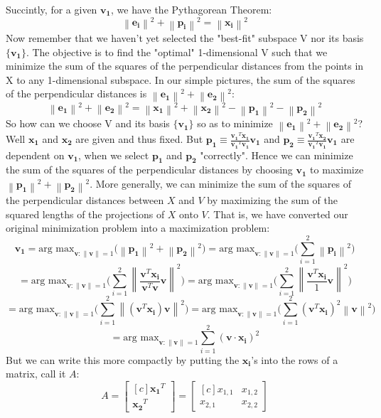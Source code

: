 \documentclass{tufte-handout}
\newcommand{\norm}[1]{\left\lVert#1\right\rVert}
\begin{document}
Succintly, for a given $\mathbf{v_1}$, we have the Pythagorean Theorem:
\[
\norm{\mathbf{e_i}}^2+\norm{\mathbf{p_i}}^2
=\norm{\mathbf{x_i}}^2
\]
Now remember that we haven't yet selected the "best-fit" subspace V nor its basis $\{\mathbf{v_1}\}$. The objective is to find the "optimal" 1-dimensional V such that we minimize the sum of the squares of the perpendicular distances from the points in X to any 1-dimensional subspace. In our simple pictures, the sum of the squares of the perpendicular distances is $\norm{\mathbf{e_1}}^2+\norm{\mathbf{e_2}}^2$:
\[
\norm{\mathbf{e_1}}^2+\norm{\mathbf{e_2}}^2
=
\norm{\mathbf{x_1}}^2+\norm{\mathbf{x_2}}^2
-
\norm{\mathbf{p_1}}^2-\norm{\mathbf{p_2}}^2
\]
So how can we choose V and its basis $\{\mathbf{v_1}\}$ so as to minimize $\norm{\mathbf{e_1}}^2+\norm{\mathbf{e_2}}^2$? Well $\mathbf{x_1}$ and $\mathbf{x_2}$ are given and thus fixed. But $\mathbf{p_1} \equiv\frac{\mathbf{v_1}^T\mathbf{x_1}} {\mathbf{v_1}^T\mathbf{v_1}}\mathbf{v_1}$ and $\mathbf{p_2} \equiv\frac{\mathbf{v_1}^T\mathbf{x_2}} {\mathbf{v_1}^T\mathbf{v_1}}\mathbf{v_1}$ are dependent on $\mathbf{v_1}$, when we select $\mathbf{p_1}$ and $\mathbf{p_2}$ "correctly". Hence we can minimize the sum of the squares of the perpendicular distances by choosing $\mathbf{v_1}$ to maximize $\norm{\mathbf{p_1}}^2+\norm{\mathbf{p_2}}^2$. More generally, we can minimize the sum of the squares of the perpendicular distances between $X$ and $V$ by maximizing the sum of the squared lengths of the projections of $X$ onto $V$. That is, we have converted our original minimization problem into a maximization problem:
\[
\mathbf{v_1}
=
\text{arg max}_
{\mathbf{v}:\norm{\mathbf{v}}=1}\Big(\norm{\mathbf{p_1}}^2+\norm{\mathbf{p_2}}^2\Big)
=
\text{arg max}_
{\mathbf{v}:\norm{\mathbf{v}}=1}\Big(\sum_{i=1}^{2}\norm{\mathbf{p_i}}^2\Big)
\]
\[
=
\text{arg max}_
{\mathbf{v}:\norm{\mathbf{v}}=1}\Big(\sum_{i=1}^{2}\norm{\frac{\mathbf{v}^T\mathbf{x_i}} {\mathbf{v}^T\mathbf{v}}\mathbf{v}}^2\Big)
=
\text{arg max}
_{\mathbf{v}:\norm{\mathbf{v}}=1}\Big(\sum_{i=1}^{2}\norm{\frac{\mathbf{v}^T\mathbf{x_i}} {1}\mathbf{v}}^2\Big)
\]
\[
=
\text{arg max}
_{\mathbf{v}:\norm{\mathbf{v}}=1}\Big(\sum_{i=1}^{2}\norm{(\mathbf{v}^T\mathbf{x_i})\mathbf{v}}^2\Big)
=
\text{arg max}
_{\mathbf{v}:\norm{\mathbf{v}}=1}\Big(\sum_{i=1}^{2}(\mathbf{v}^T\mathbf{x_i})^2\norm{\mathbf{v}}^2\Big)
\]
\[
=
\text{arg max}
_{\mathbf{v}:\norm{\mathbf{v}}=1}\sum_{i=1}^{2}(\mathbf{v}\cdot\mathbf{x_i})^2
\]
But we can write this more compactly by putting the $\mathbf{x_i}$'s into the rows of a matrix, call it $A$:
\[
A=
\begin{bmatrix*}[c]
\mathbf{x_1}^T\\ \mathbf{x_2}^T
\end{bmatrix*}
=
\begin{bmatrix*}[c]
x_{1,1}&x_{1,2}\\
x_{2,1}&x_{2,2}
\end{bmatrix*}
\]
\end{document}
